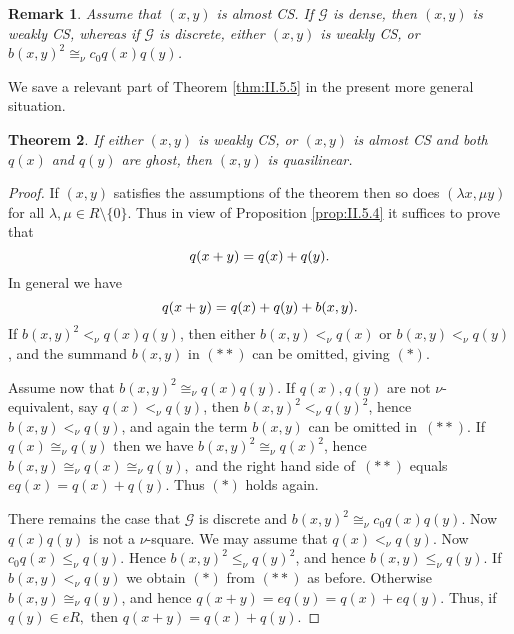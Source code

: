 \documentclass [12pt,a4paper,reqno]{amsart}
\def\00{ \{ 0 \}}
\newtheorem{thm}{Theorem} [section]
\newtheorem{remark}[thm]{Remark}
\begin{document}
\begin{remark}\label{rem:II.5.11}
Assume that $(x,y)$ is almost CS. If ${\mathcal G}$ is dense, then $(x,y)$ is weakly CS, whereas if ${\mathcal G}$ is discrete, either $(x,y) $ is weakly CS, or $b(x,y)^2 {\cong_\nu} c_0 q(x)q(y)$.
\end{remark}
We save a relevant part of Theorem \ref{thm:II.5.5} in the present more general situation.

\begin{thm}\label{thm:II.5.12}
If either $(x,y)$ is weakly CS, or  $(x,y)$ is almost  CS and both $q(x) $ and $q(y)$ are ghost, then $(x,y)$  is quasilinear.
\end{thm}

\begin{proof}
If $(x,y)$ satisfies the assumptions of the theorem then so does $({\lambda} x, \mu y)$ for all ${\lambda}, \mu \in R {\setminus} \00.$
Thus in  view of  Proposition \ref{prop:II.5.4} it  suffices to prove that
 \begin{equation}\addtocounter{equation}{-1}\label{eq:str.1}
q(x+y) = q(x) + q(y).
\end{equation}
In general we have
 \begin{equation}\addtocounter{equation}{-1}\label{eq:str.1}
q(x+y) = q(x) + q(y) + b(x,y).
\end{equation}
If $b(x,y)^2 {<_\nu} q(x) q(y)$, then either
$b(x,y) {<_\nu} q(x) $ or $b(x,y) {<_\nu}  q(y)$, and the summand $b(x,y)$ in $(**)$ can be omitted, giving $(*).$
{\vskip 1.5mm \noindent}

Assume now that $b(x,y)^2 {\cong_\nu} q(x) q(y)$. If $q(x), q(y)$ are not $\nu$-equivalent, say $q(x) {<_\nu} q(y)$, then $b(x,y)^2 {<_\nu} q(y)^2$, hence  $b(x,y) {<_\nu} q(y)$, and again the term $b(x,y)$ can be omitted in~$(**)$.  If $q(x) {\cong_\nu} q(y)$ then we have  $b(x,y)^2 {\cong_\nu} q(x)^2$, hence
 $b(x,y) {\cong_\nu} q(x) {\cong_\nu} q(y),$ and the right hand side of~$(**)$ equals $eq(x) = q(x) + q(y).$ Thus $(*) $ holds again. {\vskip 1.5mm \noindent}

There remains the case  that ${\mathcal G}$ is discrete and $b(x,y)^2 {\cong_\nu} c_0 q(x) q(y).$ Now $q(x)q(y)$ is not  a $\nu$-square. We may assume   that $q(x) {<_\nu} q(y)$. Now $c_0 q(x) {\leq_\nu} q(y)$. Hence   $b(x,y)^2 {\leq_\nu} q(y)^2$, and  hence  $b(x,y) {\leq_\nu}  q(y)$. If $b(x,y) {<_\nu}  q(y)$ we obtain $(*)$ from $(**)$ as before. Otherwise  $b(x,y) {\cong_\nu}  q(y)$, and hence $q(x+y)= eq(y)= q(x) + eq(y).$ Thus, if $q(y) \in eR,$ then $q(x+ y)  = q(x) + q(y).$
\end{proof}
\end{document}
